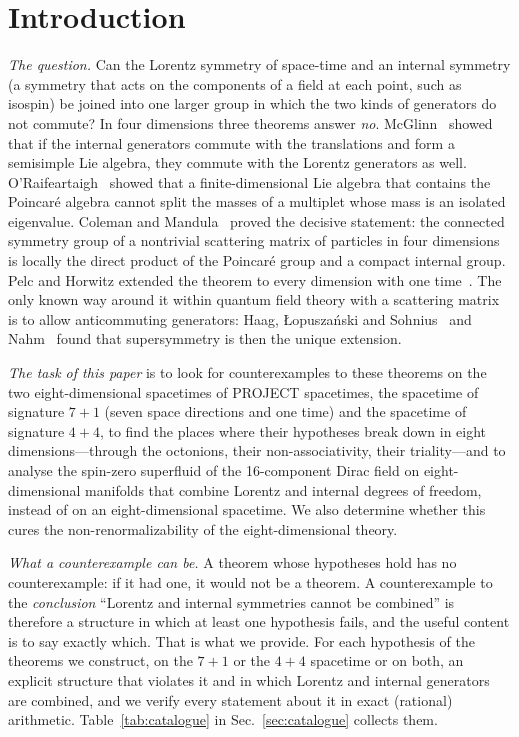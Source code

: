 \section{Introduction}
\label{sec:intro}

\emph{The question.} Can the Lorentz symmetry of space-time and an internal symmetry (a symmetry
that acts on the components of a field at each point, such as isospin) be joined into one larger
group in which the two kinds of generators do not commute? In four dimensions three theorems answer
\emph{no}. McGlinn~\cite{McGlinn1964} showed that if the internal generators commute with the
translations and form a semisimple Lie algebra, they commute with the Lorentz generators as well.
O'Raifeartaigh~\cite{ORaifeartaigh1965} showed that a finite-dimensional Lie algebra that contains
the Poincar\'e algebra cannot split the masses of a multiplet whose mass is an isolated eigenvalue.
Coleman and Mandula~\cite{ColemanMandula1967} proved the decisive statement: the connected symmetry
group of a nontrivial scattering matrix of particles in four dimensions is locally the direct
product of the Poincar\'e group and a compact internal group. Pelc and Horwitz extended the theorem
to every dimension with one time~\cite{PelcHorwitz1997}. The only known way around it within quantum
field theory with a scattering matrix is to allow anticommuting generators: Haag, {\L}opusza\'nski
and Sohnius~\cite{HLS1975} and Nahm~\cite{Nahm1978} found that supersymmetry is then the unique
extension.

\emph{The task of this paper} is to look for counterexamples to these theorems on the two
eight-dimensional spacetimes of PROJECT spacetimes, the spacetime of signature $7+1$ (seven space
directions and one time) and the spacetime of signature $4+4$, to find the places where their
hypotheses break down in eight dimensions---through the octonions, their non-associativity, their
triality---and to analyse the spin-zero superfluid of the 16-component Dirac field on eight-dimensional
manifolds that combine Lorentz and internal degrees of freedom, instead of on an eight-dimensional
spacetime. We also determine whether this cures the non-renormalizability of the eight-dimensional
theory.

\emph{What a counterexample can be.} A theorem whose hypotheses hold has no counterexample: if it
had one, it would not be a theorem. A counterexample to the \emph{conclusion} ``Lorentz and internal
symmetries cannot be combined'' is therefore a structure in which at least one hypothesis fails, and
the useful content is to say exactly which. That is what we provide. For each hypothesis of the
theorems we construct, on the $7+1$ or the $4+4$ spacetime or on both, an explicit structure that
violates it and in which Lorentz and internal generators are combined, and we verify every statement
about it in exact (rational) arithmetic. Table~\ref{tab:catalogue} in Sec.~\ref{sec:catalogue}
collects them.

